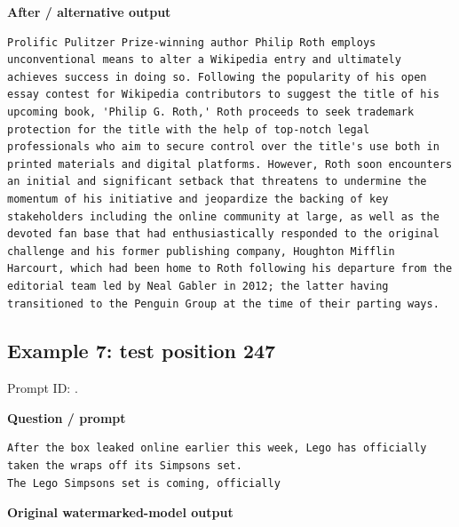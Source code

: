 \textbf{After / alternative output}

\begin{Verbatim}
Prolific Pulitzer Prize-winning author Philip Roth employs unconventional means to alter a Wikipedia entry and ultimately achieves success in doing so. Following the popularity of his open essay contest for Wikipedia contributors to suggest the title of his upcoming book, 'Philip G. Roth,' Roth proceeds to seek trademark protection for the title with the help of top-notch legal professionals who aim to secure control over the title's use both in printed materials and digital platforms. However, Roth soon encounters an initial and significant setback that threatens to undermine the momentum of his initiative and jeopardize the backing of key stakeholders including the online community at large, as well as the devoted fan base that had enthusiastically responded to the original challenge and his former publishing company, Houghton Mifflin Harcourt, which had been home to Roth following his departure from the editorial team led by Neal Gabler in 2012; the latter having transitioned to the Penguin Group at the time of their parting ways.
\end{Verbatim}

\subsection{Example 7: test position
247}\label{record-docs-watermarking-qualitative-paper-sir-bira-md-example-7-test-position-247}

Prompt ID:
\texttt{}.

\textbf{Question / prompt}

\begin{Verbatim}
After the box leaked online earlier this week, Lego has officially taken the wraps off its Simpsons set.
The Lego Simpsons set is coming, officially
\end{Verbatim}

\textbf{Original watermarked-model output}

